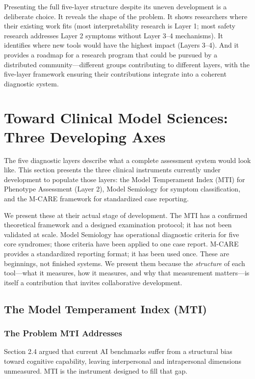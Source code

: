 \documentclass[11pt]{article}
\begin{document}
Presenting the full five-layer structure despite its uneven development is a deliberate choice. It reveals the shape of the problem. It shows researchers where their existing work fits (most interpretability research is Layer 1; most safety research addresses Layer 2 symptoms without Layer 3--4 mechanisms). It identifies where new tools would have the highest impact (Layers 3--4). And it provides a roadmap for a research program that could be pursued by a distributed community---different groups contributing to different layers, with the five-layer framework ensuring their contributions integrate into a coherent diagnostic system.

\section{Toward Clinical Model Sciences: Three Developing Axes}

The five diagnostic layers describe what a complete assessment system would look like. This section presents the three clinical instruments currently under development to populate those layers: the Model Temperament Index (MTI) for Phenotype Assessment (Layer 2), Model Semiology for symptom classification, and the M-CARE framework for standardized case reporting.

We present these at their actual stage of development. The MTI has a confirmed theoretical framework and a designed examination protocol; it has not been validated at scale. Model Semiology has operational diagnostic criteria for five core syndromes; those criteria have been applied to one case report. M-CARE provides a standardized reporting format; it has been used once. These are beginnings, not finished systems. We present them because the \emph{structure} of each tool---what it measures, how it measures, and why that measurement matters---is itself a contribution that invites collaborative development.

\subsection{The Model Temperament Index (MTI)}

\subsubsection{The Problem MTI Addresses}

Section 2.4 argued that current AI benchmarks suffer from a structural bias toward cognitive capability, leaving interpersonal and intrapersonal dimensions unmeasured. MTI is the instrument designed to fill that gap.
\end{document}
